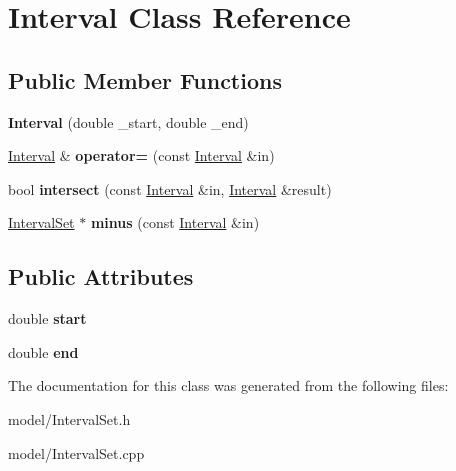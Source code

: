 \hypertarget{classInterval}{\section{Interval Class Reference}
\label{classInterval}
}
\subsection*{Public Member Functions}
\begin{DoxyCompactItemize}
\item 
\hypertarget{classInterval_a8d429d3ac6f7b70133baecd1467dca1f}{{\bfseries Interval} (double \-\_\-start, double \-\_\-end)}\label{classInterval_a8d429d3ac6f7b70133baecd1467dca1f}

\item 
\hypertarget{classInterval_ab26781b302eecfc9d06dfc80be34baac}{\hyperlink{classInterval}{Interval} \& {\bfseries operator=} (const \hyperlink{classInterval}{Interval} \&in)}\label{classInterval_ab26781b302eecfc9d06dfc80be34baac}

\item 
\hypertarget{classInterval_a240cc6cdc44fd2f4715725eda900db63}{bool {\bfseries intersect} (const \hyperlink{classInterval}{Interval} \&in, \hyperlink{classInterval}{Interval} \&result)}\label{classInterval_a240cc6cdc44fd2f4715725eda900db63}

\item 
\hypertarget{classInterval_a4b68948ef478868d12f17ff4bbbd92f9}{\hyperlink{classIntervalSet}{Interval\-Set} $\ast$ {\bfseries minus} (const \hyperlink{classInterval}{Interval} \&in)}\label{classInterval_a4b68948ef478868d12f17ff4bbbd92f9}

\end{DoxyCompactItemize}
\subsection*{Public Attributes}
\begin{DoxyCompactItemize}
\item 
\hypertarget{classInterval_ae63ae31c07265309f48a39ce2472b692}{double {\bfseries start}}\label{classInterval_ae63ae31c07265309f48a39ce2472b692}

\item 
\hypertarget{classInterval_a3e157b77bf832e92c26fbe3283717d74}{double {\bfseries end}}\label{classInterval_a3e157b77bf832e92c26fbe3283717d74}

\end{DoxyCompactItemize}


The documentation for this class was generated from the following files\-:\begin{DoxyCompactItemize}
\item 
model/Interval\-Set.\-h\item 
model/Interval\-Set.\-cpp\end{DoxyCompactItemize}
